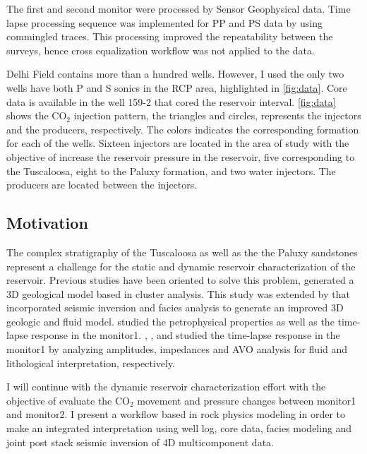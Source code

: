 The first and second monitor were processed by Sensor Geophysical data. 
Time lapse processing sequence was implemented for PP and PS data by 
using commingled traces. This processing improved the repeatability 
between the surveys, hence cross equalization workflow was not applied to the data. 

Delhi Field contains more than a hundred wells. However, I used the only two wells 
have  both P and S sonics in the RCP area, highlighted in \ref{fig:data}.
Core data is available in the well 159-2 that cored the reservoir interval. \ref{fig:data}
shows the CO$_2$ injection pattern, the triangles and circles, represents the 
injectors and the producers, respectively. The colors indicates the corresponding 
formation for each of the wells. Sixteen injectors are located in the area of study with
the objective of increase the reservoir pressure in the reservoir, 
five corresponding to the Tuscaloosa, eight to the Paluxy formation, and two water
injectors. The producers are located between the injectors.




\subsection{Motivation}

The complex stratigraphy of the Tuscaloosa as well as the the Paluxy
sandstones represent a challenge for the  static and dynamic reservoir 
characterization of the reservoir. Previous studies have been oriented
to solve this problem, \cite{ref:nick} generated a 3D geological model
based in cluster analysis. This study was extended by \cite{ref:doug} that 
incorporated seismic inversion and facies analysis to generate an improved
3D geologic and fluid model. \cite{ref:assem} studied the petrophysical properties
as well as the time-lapse response in the monitor1. \cite{ref:holly},
\cite{ref:julio}, and \cite{ref:ishan} studied the time-lapse response in the monitor1
by analyzing amplitudes, impedances and AVO analysis for fluid and lithological 
interpretation, respectively.

I will continue with the dynamic reservoir characterization effort with 
the objective of evaluate the CO$_2$ movement and pressure changes between 
monitor1 and monitor2. I present a workflow based in rock physics modeling 
in order to make an integrated interpretation using well log, core data, 
facies modeling and joint post stack seismic inversion of 4D multicomponent
data.

